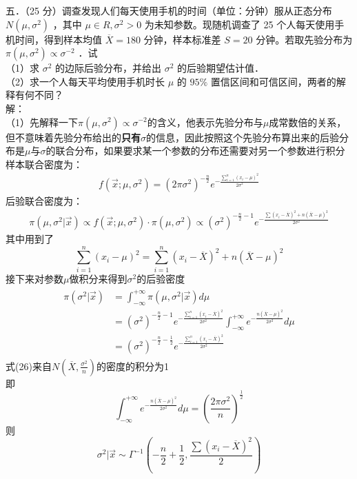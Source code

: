 \documentclass[12pt]{article}
\begin{document}
\noindent 五．（25 分）调查发现人们每天使用手机的时间（单位：分钟）服从正态分布 $N\left(\mu, \sigma^{2}\right)$ ，其中 $\mu \in R, \sigma^{2}>0$ 为未知参数。现随机调查了 25 个人每天使用手机时间，得到样本均值 $\overline{X}=180$ 分钟，样本标准差 $S=20$ 分钟。若取先验分布为 $\pi\left(\mu, \sigma^{2}\right) \propto \sigma^{-2}$ ．试\\
（1）求 $\sigma^{2}$ 的边际后验分布，并给出 $\sigma^{2}$ 的后验期望估计值．\\
（2）求一个人每天平均使用手机时长 $\mu$ 的 $95 \%$ 置信区间和可信区间，两者的解释有何不同？\\
解：\\
（1）先解释一下$\pi\left(\mu, \sigma^{2}\right) \propto \sigma^{-2}$的含义，他表示先验分布与$\mu$成常数倍的关系，但不意味着先验分布给出的\textbf{只有}$\sigma$的信息，因此按照这个先验分布算出来的后验分布是$\mu$与$\sigma$的联合分布，如果要求某一个参数的分布还需要对另一个参数进行积分\\
样本联合密度为：
\begin{gather}
f(\vec{x};\mu,\sigma^2)=(2\pi \sigma^2)^{-\frac{n}{2}}e^{-\frac{\sum_{i=1}^{n} (x_i-\mu)^2}{2\sigma^2}}
\end{gather}
后验联合密度为：
\begin{gather}
\pi(\mu,\sigma^2|\vec{x}) \propto f(\vec{x};\mu,\sigma^2)\cdot\pi\left(\mu, \sigma^{2}\right) \propto (\sigma^2)^{-\frac{n}{2}-1}e^{-\frac{\sum (x_i-\overline{X})^2 +n(\overline{X}-\mu)^2}{2\sigma^2}}
\end{gather}
其中用到了
$$\sum_{i=1}^{n} (x_i-\mu)^2=\sum_{i=1}^{n} (x_i-\overline{X})^2 +n(\overline{X}-\mu)^2$$
接下来对参数$\mu$做积分来得到$\sigma^2$的后验密度
\begin{gather}
	\begin{aligned}
		\pi(\sigma^2|\vec{x})&=\int_{-\infty}^{+\infty} \pi(\mu , \sigma^2|\vec{x})d\mu\\
		&=(\sigma^2)^{-\frac{n}{2}-1}e^{-\frac{\sum_{i=1}^n (x_i-\overline{X})^2}{2\sigma^2}} \int_{-\infty}^{+\infty}e^{-\frac{n(\overline{X}-\mu)^2}{2\sigma^2}}d\mu\\
		&=(\sigma^2)^{-\frac{n}{2}-\frac{1}{2}}e^{-\frac{\sum_{i=1}^n (x_i-\overline{X})^2}{2\sigma^2}} 
	\end{aligned}
\end{gather}
式(26)来自$N(\overline{X},\frac{\sigma^2}{n})$的密度的积分为1\\
即
\[
\int_{-\infty}^{+\infty}e^{-\frac{n(\overline{X}-\mu)^2}{2\sigma^2}}d\mu=(\frac{2\pi \sigma^2}{n})^{\frac{1}{2}}
\]
则
\[
\sigma^2|\vec{x} \sim \Gamma^{-1}(-\frac{n}{2}+\frac{1}{2},\frac{\sum (x_i-\overline{X})^2}{2})
\]
\end{document}
